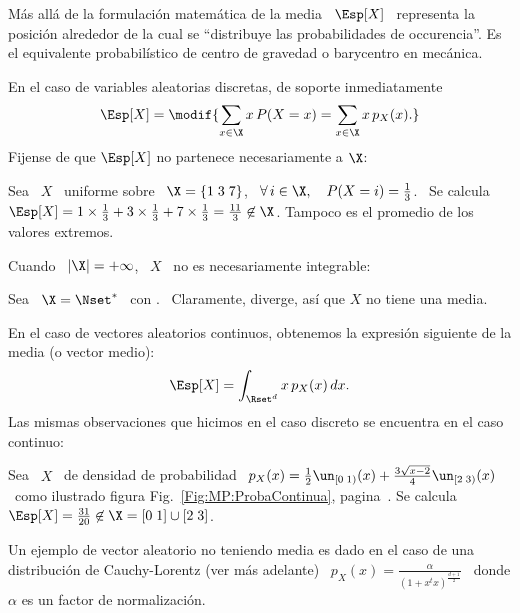 M\'as  all\'a  de  la formulaci\'on  matem\'atica  de  la  media \  $\Esp[X]$  \
representa la posici\'on alrededor de la cual se ``distribuye las probabilidades
de  occurencia''. Es  el equivalente  probabil\'istico de  centro de  gravedad o
barycentro en mec\'anica.

En el  caso de variables  aleatorias discretas, de soporte  \modif{$\X$ discreto
  finito o numerable,} inmediatamente
%
\[
\Esp[X] = \modif{\sum_{x \in \X} x \, P(X = x) = \sum_{x \in \X} x \, p_X(x).}
\]
%
\noindent  Fijense de  que $\Esp[X]$  no partenece  necesariamente a  $\X$:
%
\begin{ejemplo}
\label{Ej:MP:Uniforme3Estados}
%
  Sea \  $X$ \  uniforme sobre \  $\X = \{  1 \; 3  \; 7 \}$,  \ie \
  $\forall \,  i \in \X, \quad  P(X = i) =  \frac13$. \ Se calcula  $\Esp[X] = 1
  \times \frac13  + 3 \times \frac13  + 7 \times \frac13  = \frac{11}{3} \not\in
  \X$.  Tampoco es el promedio de los valores extremos.
\end{ejemplo}
%
\noindent Cuando \ $|\X| = +\infty$, \ $X$ \ no es necesariamente integrable:
%
\begin{ejemplo}
\label{Ej:MP:DiscretaSinMedia}
%
Sea  \ $\X  = \Nset^*$  \ con  . \
Claramente,  diverge, as\'i que $X$ no tiene
una media.
\end{ejemplo}

En el caso de vectores  aleatorios continuos, obtenemos la expresi\'on siguiente
de la media (o vector medio):
%
\[
\Esp[X] = \int_{\Rset^d} x \, p_X(x) \, dx.
\]
%
\noindent Las mismas observaciones que  hicimos en el caso discreto se encuentra
en el caso continuo:
%
\begin{ejemplo}
\label{Ej:MP:MediaNoEnX}
%
Sea \ $X$ \ de densidad de  probabilidad \ $p_X(x) = \frac12 \un_{[0 \; 1)}(x) +
\frac{3   \sqrt{x-2}}{4}   \un_{[2   \;   3)}(x)$  \   como   ilustrado   figura
Fig.~\ref{Fig:MP:ProbaContinua},    pagina~\pageref{Fig:MP:ProbaContinua}.    Se
calcula \ $\Esp[X] = \frac{31}{20} \not\in \X = [0 \; 1] \cup [2 \; 3]$.
\end{ejemplo}
%
\begin{ejemplo}
\label{Ej:MP:VariableCauchySinMedia}
%
  Un ejemplo  de vector aleatorio no  teniendo media es  dado en el caso  de una
  distribuci\'on de Cauchy-Lorentz (ver  m\'as adelante) \ $\displaystyle p_X(x)
  = \frac{\alpha}{\left( 1 + x^t x \right)^{\frac{d+1}{2}}}$ \ donde $\alpha$ es
  un factor de normalizaci\'on.
\end{ejemplo}

